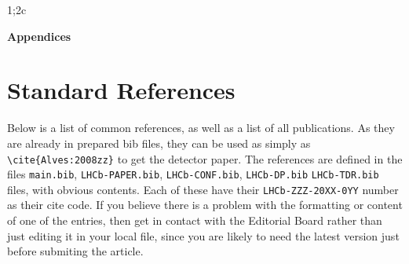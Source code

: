 1;2c%

\clearpage

{\noindent\normalfont\bfseries\Large Appendices}

\appendix

\section{Standard References}
\label{sec:StandardReferences}
Below is a list of common references, as
well as a list of all \lhcb publications. 
As they are already in prepared bib files, they can be used as simply as
\texttt{\textbackslash cite\{Alves:2008zz\}} to get the \lhcb detector paper. 
The references are defined in the files \texttt{main.bib},  \texttt{LHCb-PAPER.bib},
\texttt{LHCb-CONF.bib}, \texttt{LHCb-DP.bib} \texttt{LHCb-TDR.bib} files, with obvious contents.
Each of these have their \texttt{LHCb-ZZZ-20XX-0YY} number as their cite code.
If you believe there is a problem with the formatting or
content of one of the entries, then get in contact with the Editorial
Board rather than just editing it in your local file,
since you are likely to need the latest version just before submiting the article.

